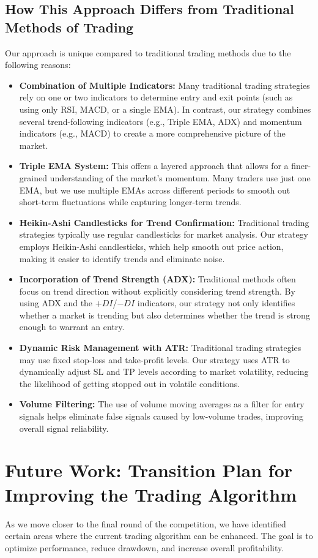 \documentclass[12pt]{article}
\begin{document}
\subsection{How This Approach Differs from Traditional Methods of Trading}
Our approach is unique compared to traditional trading methods due to the following reasons:
\begin{itemize}
    \item \textbf{Combination of Multiple Indicators:} Many traditional trading strategies rely on one or two indicators to determine entry and exit points (such as using only RSI, MACD, or a single EMA). In contrast, our strategy combines several trend-following indicators (e.g., Triple EMA, ADX) and momentum indicators (e.g., MACD) to create a more comprehensive picture of the market.
    \item \textbf{Triple EMA System:} This offers a layered approach that allows for a finer-grained understanding of the market's momentum. Many traders use just one EMA, but we use multiple EMAs across different periods to smooth out short-term fluctuations while capturing longer-term trends.
    \item \textbf{Heikin-Ashi Candlesticks for Trend Confirmation:} Traditional trading strategies typically use regular candlesticks for market analysis. Our strategy employs Heikin-Ashi candlesticks, which help smooth out price action, making it easier to identify trends and eliminate noise.
    \item \textbf{Incorporation of Trend Strength (ADX):} Traditional methods often focus on trend direction without explicitly considering trend strength. By using ADX and the $+DI$/$-DI$ indicators, our strategy not only identifies whether a market is trending but also determines whether the trend is strong enough to warrant an entry.
    \item \textbf{Dynamic Risk Management with ATR:} Traditional trading strategies may use fixed stop-loss and take-profit levels. Our strategy uses ATR to dynamically adjust SL and TP levels according to market volatility, reducing the likelihood of getting stopped out in volatile conditions.
    \item \textbf{Volume Filtering:} The use of volume moving averages as a filter for entry signals helps eliminate false signals caused by low-volume trades, improving overall signal reliability.
\end{itemize}

\newpage
\section{Future Work: Transition Plan for Improving the Trading Algorithm}
As we move closer to the final round of the competition, we have identified certain areas where the current trading algorithm can be enhanced. The goal is to optimize performance, reduce drawdown, and increase overall profitability.
\end{document}
